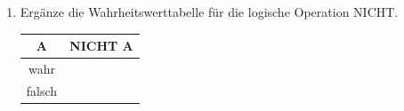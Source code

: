 \begin{aufgabe}
\begin{enumerate}[label=\alph*), itemsep=0ex, parsep=0ex]
		\medskip
		\item Ergänze die Wahrheitswerttabelle für die logische Operation NICHT.
			
			\medskip
			\begin{minipage}{0.4\textwidth}
				
			\end{minipage}
			\hfill
			\begin{minipage}{0.4\textwidth}
				\centering
				\begin{tabular}{c | c}
					\textbf{A}  & \textbf{NICHT A} \\ \hline
					wahr &  \\
					falsch &  \\  
				\end{tabular}
			\end{minipage}
			\hfill
	\end{enumerate}
\end{aufgabe}


